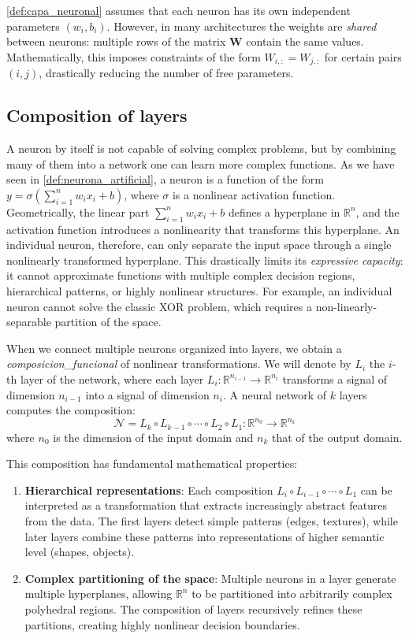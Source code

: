\autoref{def:capa_neuronal} assumes that each neuron has its own independent parameters $(w_i, b_i)$. However, in many architectures the weights are \textit{shared} between neurons: multiple rows of the matrix $\mathbf{W}$ contain the same values. Mathematically, this imposes constraints of the form $W_{i,:} = W_{j,:}$ for certain pairs $(i,j)$, drastically reducing the number of free parameters.

\subsection{Composition of layers}

A neuron by itself is not capable of solving complex problems, but by combining many of them into a network one can learn more complex functions. As we have seen in \autoref{def:neurona_artificial}, a neuron is a function of the form $y = \sigma\left(\sum_{i=1}^n w_i x_i + b\right)$, where $\sigma$ is a nonlinear activation function. Geometrically, the linear part $\sum_{i=1}^n w_i x_i + b$ defines a hyperplane in $\mathbb{R}^n$, and the activation function introduces a nonlinearity that transforms this hyperplane. An individual neuron, therefore, can only separate the input space through a single nonlinearly transformed hyperplane. This drastically limits its \textit{expressive capacity}: it cannot approximate functions with multiple complex decision regions, hierarchical patterns, or highly nonlinear structures. For example, an individual neuron cannot solve the classic XOR problem, which requires a non-linearly-separable partition of the space.

When we connect multiple neurons organized into layers, we obtain a \textit{\gls{composicion_funcional}} of nonlinear transformations. We will denote by $L_i$ the $i$-th layer of the network, where each layer $L_i: \mathbb{R}^{n_{i-1}} \to \mathbb{R}^{n_i}$ transforms a signal of dimension $n_{i-1}$ into a signal of dimension $n_i$. A neural network of $k$ layers computes the composition:
\[
\mathcal{N} = L_k \circ L_{k-1} \circ \cdots \circ L_2 \circ L_1: \mathbb{R}^{n_0} \to \mathbb{R}^{n_k}
\]
where $n_0$ is the dimension of the input domain and $n_k$ that of the output domain.

This composition has fundamental mathematical properties:
\begin{enumerate}
    \item \textbf{Hierarchical representations}: Each composition $L_i \circ L_{i-1} \circ \cdots \circ L_1$ can be interpreted as a transformation that extracts increasingly abstract features from the data. The first layers detect simple patterns (edges, textures), while later layers combine these patterns into representations of higher semantic level (shapes, objects).

    \item \textbf{Complex partitioning of the space}: Multiple neurons in a layer generate multiple hyperplanes, allowing $\mathbb{R}^n$ to be partitioned into arbitrarily complex polyhedral regions. The composition of layers recursively refines these partitions, creating highly nonlinear decision boundaries.
\end{enumerate}

